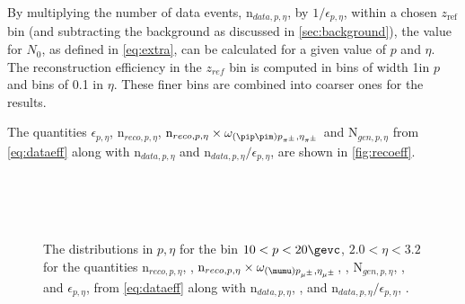  
By multiplying the number of data events, $\textrm{n}_{data, p, \eta}$, by $1/\epsilon_{p,\eta}$, within a chosen $z_{\mathrm{ref}}$ bin (and subtracting the background as discussed in \autoref{sec:background}), the value for $N_{0}$, as defined in \autoref{eq:extra}, can be calculated for a given value of $p$ and $\eta$. The reconstruction efficiency in the $z_{ref}$ bin is computed in bins of width 1\gevc in $p$ and bins of 0.1 in $\eta$.  These finer bins are combined into coarser ones for the results. %

The quantities $\epsilon_{p,\eta}$, $\textrm{n}_{reco, p, \eta}$, $\textrm{n}_{reco, p, \eta}\times \omega_{(\pip\pim)p_{\pi^{\pm}},\eta_{\pi^{\pm}}}$ and $\textrm{N}_{gen, p, \eta}$ from \autoref{eq:dataeff} along with $\textrm{n}_{data, p, \eta}$ and $\textrm{n}_{data, p, \eta}/\epsilon_{p,\eta}$, are shown in \autoref{fig:recoeff}.



 
\begin{figure}[h!]
  \begin{center}
   \vspace*{-1.5cm}
    \\
    \\
    \\
        
\end{center}
  \caption{The distributions in $p,\eta$ for the bin $10<p<20 \gevc$, $2.0<\eta<3.2$ for the quantities $\textrm{n}_{reco, p, \eta}$, \protect{}, $\textrm{n}_{reco, p, \eta}\times \omega_{(\mumu)p_{\mu^{\pm}},\eta_{\mu^{\pm}}}$, \protect{}, $\textrm{N}_{gen, p, \eta}$, \protect{}, and $\epsilon_{p,\eta}$, \protect{} from \autoref{eq:dataeff} along with $\textrm{n}_{data, p, \eta}$, \protect{}, and $\textrm{n}_{data, p, \eta}/\epsilon_{p,\eta}$, \protect{}.
    \label{fig:recoeff}}
\end{figure}

